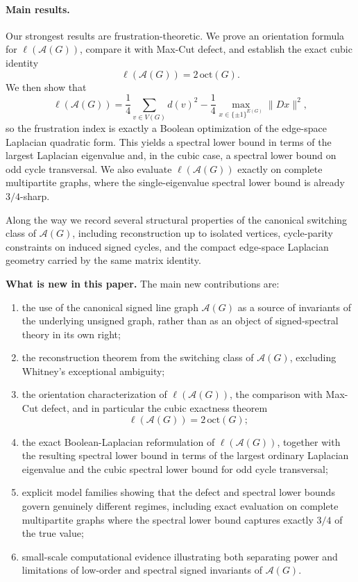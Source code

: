 \documentclass[11pt]{article}
\theoremstyle{plain}
\begin{document}
\paragraph{Main results.}
Our strongest results are frustration-theoretic. We prove an orientation formula
for $\ell(\mathcal A(G))$, compare it with Max-Cut defect, and establish the
exact cubic identity
\[
\ell(\mathcal A(G))=2\,\mathrm{oct}(G).
\]
We then show that
\[
\ell(\mathcal A(G))
=
\frac14\sum_{v\in V(G)} d(v)^2
-
\frac14\max_{x\in\{\pm1\}^{E(G)}} \|Dx\|^2,
\]
so the frustration index is exactly a Boolean optimization of the edge-space
Laplacian quadratic form. This yields a spectral lower bound in terms of the
largest Laplacian eigenvalue and, in the cubic case, a spectral lower bound on
odd cycle transversal. We also evaluate $\ell(\mathcal A(G))$ exactly on complete
multipartite graphs, where the single-eigenvalue spectral lower bound is already
$3/4$-sharp.

Along the way we record several structural properties of the canonical switching
class of $\mathcal A(G)$, including reconstruction up to isolated vertices,
cycle-parity constraints on induced signed cycles, and the compact edge-space
Laplacian geometry carried by the same matrix identity.

\medskip
\noindent\textbf{What is new in this paper.}
The main new contributions are:
\begin{enumerate}\itemsep2pt
\item[(i)] the use of the canonical signed line graph $\mathcal A(G)$ as a source
of invariants of the underlying unsigned graph, rather than as an object of
signed-spectral theory in its own right;
\item[(ii)] the reconstruction theorem from the switching class of $\mathcal A(G)$,
excluding Whitney's exceptional ambiguity;
\item[(iii)] the orientation characterization of $\ell(\mathcal A(G))$, the
comparison with Max-Cut defect, and in particular the cubic exactness theorem
\[
\ell(\mathcal A(G))=2\,\mathrm{oct}(G);
\]
\item[(iv)] the exact Boolean-Laplacian reformulation of $\ell(\mathcal A(G))$,
together with the resulting spectral lower bound in terms of the largest
ordinary Laplacian eigenvalue and the cubic spectral lower bound for odd cycle
transversal;
\item[(v)] explicit model families showing that the defect and spectral lower
bounds govern genuinely different regimes, including exact evaluation on complete
multipartite graphs where the spectral lower bound captures exactly $3/4$ of the
true value;
\item[(vi)] small-scale computational evidence illustrating both separating power
and limitations of low-order and spectral signed invariants of $\mathcal A(G)$.
\end{enumerate}
\end{document}
